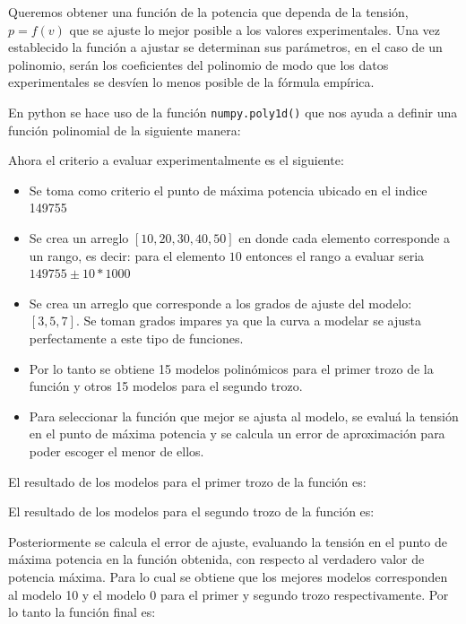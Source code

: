 \documentclass[a4paper,12pt]{article}
\begin{document}
	\newpage
	
	Queremos obtener una función de la potencia que dependa de la tensión, $p=f(v)$ que se ajuste lo mejor posible a los valores experimentales. Una vez establecido la función a ajustar se determinan sus parámetros, en el caso de un polinomio, serán los coeficientes del polinomio de modo que los datos experimentales se desvíen lo menos posible de la fórmula empírica. \newline
	
	En python se hace uso de la función \texttt{numpy.poly1d()} que nos ayuda a definir una función polinomial de la siguiente manera:

	
	
	Ahora el criterio a evaluar experimentalmente es el siguiente: 
	
	\begin{itemize}
		\item Se toma como criterio el punto de máxima potencia ubicado en el indice 149755
		\item Se crea un arreglo $\left [ 10, 20, 30, 40, 50 \right ]$ en donde cada elemento corresponde a un rango, es decir: para el elemento $10$ entonces el rango a evaluar seria $149755 \pm  10*1000$
		\item Se crea un arreglo que corresponde a los grados de ajuste del modelo: $\left [ 3,5,7 \right ]$. Se toman grados impares ya que la curva a modelar se ajusta perfectamente a este tipo de funciones.
		\item Por lo tanto se obtiene 15 modelos polinómicos para el primer trozo de la función y otros 15 modelos para el segundo trozo.
		\item Para seleccionar la función que mejor se ajusta al modelo, se evaluá la tensión en el punto de máxima potencia y se calcula un error de aproximación para poder escoger el menor de ellos.
	\end{itemize}

	
	El resultado de los modelos para el primer trozo de la función es:
	
	
	
	El resultado de los modelos para el segundo trozo de la función es:
	
	
	
	Posteriormente se calcula el error de ajuste, evaluando la tensión en el punto de máxima potencia en la función obtenida, con respecto al verdadero valor de potencia máxima. Para lo cual se obtiene que los mejores modelos corresponden al modelo 10 y el modelo 0 para el primer y segundo trozo respectivamente. Por lo tanto la función final es:
	
\end{document}
